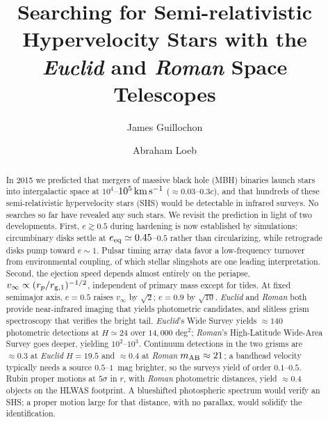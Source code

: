 \documentclass[twocolumn]{aastex701}
\begin{document}
\title{Searching for Semi-relativistic Hypervelocity Stars with the
\textit{Euclid} and \textit{Roman} Space Telescopes}


\author[0000-0002-9809-8215]{James Guillochon}

\author[0000-0003-4330-287X]{Abraham Loeb}

\begin{abstract}
In 2015 we predicted that mergers of massive black hole (MBH) binaries launch
stars into intergalactic space at $10^{4}$--$10^{5}\,{\rm km\,s^{-1}}$
($\approx0.03$--$0.3c$), and that hundreds of these semi-relativistic
hypervelocity stars (SHS) would be detectable in infrared surveys.
No searches so far have revealed any such stars. We revisit the prediction
in light of two developments. First, $e\gtrsim0.5$ during hardening is now
established by simulations: circumbinary disks settle
at $e_{\rm eq}\simeq0.45$--$0.5$ rather than circularizing, while retrograde
disks pump toward $e\sim1$. Pulsar timing array data favor a low-frequency
turnover from environmental coupling, of which stellar slingshots are one
leading interpretation. Second, the ejection speed depends almost entirely
on the periapse, $v_{\infty}\propto(r_{p}/r_{{\rm g},1})^{-1/2}$, independent of primary
mass except for tides. At fixed semimajor axis, $e=0.5$ raises
$v_{\infty}$ by $\sqrt{2}$; $e=0.9$ by $\sqrt{10}$. \textit{Euclid} and \textit{Roman}
both provide near-infrared imaging that yields photometric
candidates, and slitless grism spectroscopy that verifies the bright tail.
\textit{Euclid}'s Wide Survey yields
$\approx140$ photometric detections at $H\simeq24$ over $14{,}000$ deg$^{2}$;
\textit{Roman}'s High-Latitude Wide-Area Survey goes deeper, yielding
$10^{2}$--$10^{3}$. Continuum detections in the two grisms are
$\approx0.3$ at \textit{Euclid} $H=19.5$ and $\approx0.4$ at \textit{Roman}
$m_{\rm AB}\approx21$; a bandhead velocity typically needs a source
$0.5$--$1$~mag brighter, so the surveys yield of order $0.1$--$0.5$. Rubin proper
motions at $5\sigma$ in $r$, with \textit{Roman} photometric distances, yield
$\approx0.4$ objects on the HLWAS footprint. A blueshifted photospheric
spectrum would verify an SHS; a proper motion large for that distance, with
no parallax, would solidify the identification.
\end{abstract}
\end{document}
